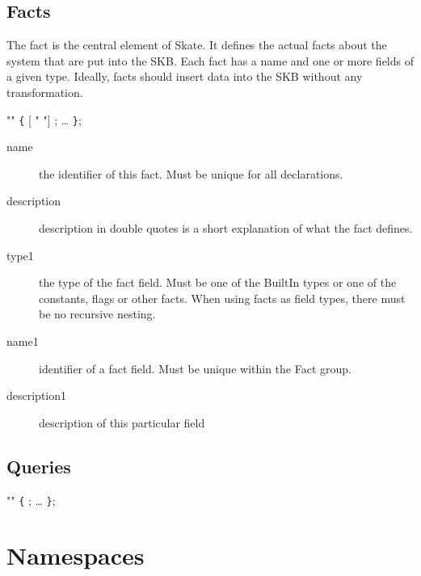 \documentclass[a4paper,11pt,twoside]{report}
\begin{document}
{{\subsection{Facts}

The fact is the central element of Skate. It defines the actual facts about the
system that are put into the SKB. Each fact has a name and one or more fields
of a given type. Ideally, facts should insert data into the SKB without any 
transformation.

\begin{syntax}
   "" \verb+{+
      [ " "] ;
    \ldots
\verb+}+;
\end{syntax}

\begin{description}
    \item[name] the identifier of this fact. Must be unique for all 
                declarations.
    
    \item[description] description in double quotes is a short explanation of
                       what the fact defines.
    
    \item[type1] the type of the fact field. Must be one of the BuiltIn types
                 or one of the constants, flags or other facts. When using 
                 facts as field types, there must be no recursive nesting.

    \item [name1] identifier of a fact field. Must be unique within the 
                  Fact group.   
    
    \item [description1] description of this particular field
\end{description}

\subsection{Queries}


\begin{syntax}
  "" \verb+{+
    ;
    \ldots
\verb+}+;
\end{syntax}

\section{Namespaces}

}}
\end{document}
